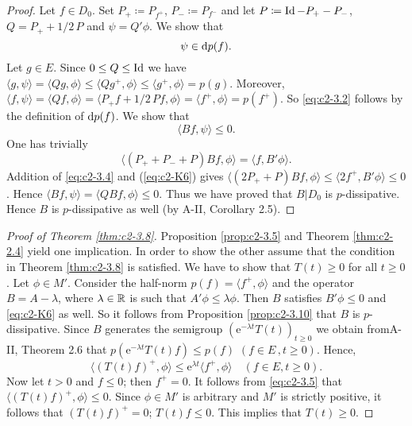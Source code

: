 \begin{proof}
Let $f \in D_{0}$. 
Set $P_{+} \coloneqq P_{f^{+}}$, $P_{-} \coloneqq P_{f^{-}}$ and let
$P \coloneqq \operatorname{Id} - P_{+} - P_{-}$, $Q = P_{+} + 1/2 \, P$ and $\psi = Q'\phi$. We show that
\begin{equation}\label{eq:c2-3.2}
\psi \in \mathop{}\!\mathrm{d}{p}(f).
\end{equation}
Let $g \in E$. 
Since $0 \leq Q \leq \operatorname{Id}$ we have 
$\langle g,\psi \rangle = \langle Qg,\phi \rangle \leq \langle Qg^{+},\phi \rangle \leq
\langle g^{+},\phi \rangle = p(g)$. 
Moreover, $\langle f, \psi \rangle = \langle Qf,\phi \rangle = \langle P_{+}f + 1/2 \, Pf,\phi \rangle = \langle f^{+},\phi \rangle = p(f^{+})$. 
So \eqref{eq:c2-3.2} follows by the definition of $\mathop{}\!\mathrm{d}{p}(f)$. 
We show that
\begin{equation}\label{eq:c2-3.3}
\langle Bf,\psi \rangle \leq 0.
\end{equation}
One has trivially
\begin{equation}\label{eq:c2-3.4}
\langle(P_{+} + P_{-} + P) Bf,\phi \rangle = \langle f,B'\phi \rangle.
\end{equation}
Addition of \eqref{eq:c2-3.4} and (\ref{eq:c2-K6})   gives
$\langle(2P_{+} + P)Bf,\phi \rangle \leq \langle 2f^{+},B'\phi \rangle \leq 0$.
Hence $\langle Bf,\psi \rangle = \langle QBf,\phi \rangle \leq 0$.
Thus we have proved that $B|D_{0}$ is $p$-dissipative. 
Hence $B$ is $p$-dissipative as well (by A-II, Corollary 2.5).
\end{proof}
\begin{proof}[Proof of Theorem \ref{thm:c2-3.8}]
Proposition \ref{prop:c2-3.5} and Theorem \ref{thm:c2-2.4}   yield one implication. 
In order to show the other assume that the condition in
Theorem \ref{thm:c2-3.8}   is satisfied. 
We have to show that $T(t) \geq 0$ for all $t \geq 0$.
Let $\phi \in M'$. 
Consider the half-norm $p(f) = \langle f^{+},\phi \rangle$ and the operator $B = A - \lambda$, where $\lambda \in \mathbb{R}$ is such that $A'\phi \leq \lambda\phi$. 
Then $B$ satisfies $B'\phi \leq 0$ and \ref{eq:c2-K6}   as well. 
So it follows from Proposition \ref{prop:c2-3.10}   that $B$ is $p$-dissipative.
Since $B$ generates the semigroup $(\mathrm{e}^{-\lambda t}T(t))_{t \geq 0}$ we obtain fromA-II, Theorem 2.6 that $p(\mathrm{e}^{-\lambda t}T(t)f) \leq p(f)$ $(f \in E\, , t\geq 0)$.
Hence,
\begin{equation} \label{eq:c2-3.5}
\langle (T(t)f)^{+}, \phi \rangle \leq \mathrm{e}^{\lambda t} \langle f^{+}, \phi \rangle \quad (f \in E, t \geq 0).
\end{equation}
Now let $t > 0$ and $f \leq 0$; then $f^{+} = 0$. 
It follows from \eqref{eq:c2-3.5} that $\langle (T(t)f)^{+},\phi \rangle \leq 0$.
Since $\phi \in M'$ is arbitrary and $M'$ is strictly positive, it follows that $(T(t)f)^{+} = 0$; \ie $T(t)f \leq 0$. 
This implies that $T(t) \geq 0$.
\end{proof}

